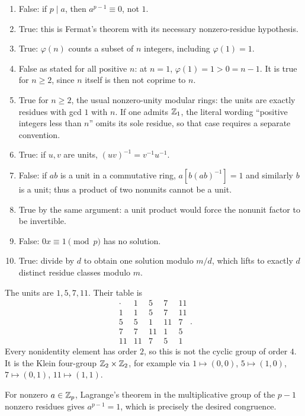 \begin{enumerate}[label=(\alph*)]
\item False: if $p\mid a$, then $a^{p-1}\equiv0$, not $1$.
\item True: this is Fermat's theorem with its necessary nonzero-residue hypothesis.
\item True: $\varphi(n)$ counts a subset of $n$ integers, including $\varphi(1)=1$.
\item False as stated for all positive $n$: at $n=1$, $\varphi(1)=1>0=n-1$. It is true for $n\ge2$, since $n$ itself is then not coprime to $n$.
\item True for $n\ge2$, the usual nonzero-unity modular rings: the units are exactly residues with gcd $1$ with $n$. If one admits $\mathbb{Z}_1$, the literal wording ``positive integers less than $n$'' omits its sole residue, so that case requires a separate convention.
\item True: if $u,v$ are units, $(uv)^{-1}=v^{-1}u^{-1}$.
\item False: if $ab$ is a unit in a commutative ring, $a[b(ab)^{-1}]=1$ and similarly $b$ is a unit; thus a product of two nonunits cannot be a unit.
\item True by the same argument: a unit product would force the nonunit factor to be invertible.
\item False: $0x\equiv1\pmod p$ has no solution.
\item True: divide by $d$ to obtain one solution modulo $m/d$, which lifts to exactly $d$ distinct residue classes modulo $m$.
\end{enumerate}

The units are $1,5,7,11$. Their table is
\[
\begin{array}{c|rrrr}\cdot&1&5&7&11\\\hline
1&1&5&7&11\\5&5&1&11&7\\7&7&11&1&5\\11&11&7&5&1
\end{array}.
\]
Every nonidentity element has order $2$, so this is not the cyclic group of order $4$. It is the Klein four-group $\mathbb{Z}_2\times\mathbb{Z}_2$, for example via $1\mapsto(0,0)$, $5\mapsto(1,0)$, $7\mapsto(0,1)$, $11\mapsto(1,1)$.

For nonzero $a\in\mathbb{Z}_p$, Lagrange's theorem in the multiplicative group of the $p-1$ nonzero residues gives $a^{p-1}=1$, which is precisely the desired congruence.

